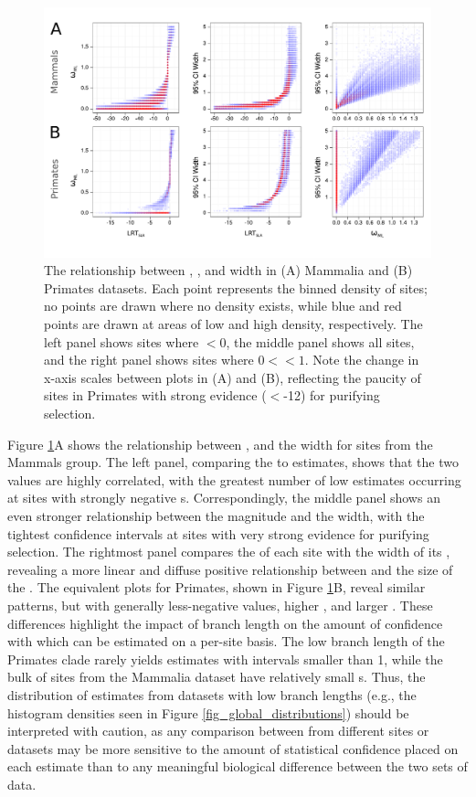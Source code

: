 \begin{figure}[b!]
\centering
\includegraphics[scale=0.5]{Figs/sites_scatters.pdf}
\caption{The relationship between \slrt, \omgml, and \ci width in (A)
  Mammalia and (B) Primates datasets. Each point represents the binned
  density of sites; no points are drawn where no density exists, while
  blue and red points are drawn at areas of low and high density,
  respectively. The left panel shows sites where \omgml$<0$, the
  middle panel shows all sites, and the right panel shows sites where
  $0<$\xspace\omgml$<1$. Note the change in x-axis scales between plots
  in (A) and (B), reflecting the paucity of sites in Primates with
  strong evidence (\slrt$<$-12) for purifying selection.}
\label{fig_sites_scatters}
\end{figure}

Figure \ref{fig_sites_scatters}A shows the relationship between \slrt,
\omgml and the \ci width for sites from the Mammals group. The left
panel, comparing the \slrt to \nz \omgml estimates, shows that the two
values are highly correlated, with the greatest number of low \omgml
estimates occurring at sites with strongly negative
\slrt{}s. Correspondingly, the middle panel shows an even stronger
relationship between the \slrt magnitude and the \ci width, with the
tightest confidence intervals at sites with very strong evidence for
purifying selection. The rightmost panel compares the \omgml of each
site with the width of its \ci, revealing a more linear and diffuse
positive relationship between \omgml and the size of the \ci. The
equivalent plots for Primates, shown in Figure
\ref{fig_sites_scatters}B, reveal similar patterns, but with generally
less-negative \slrt values, higher \omgml, and larger \ci. These
differences highlight the impact of branch length on the amount of
confidence with which \omg can be estimated on a per-site basis. The
low branch length of the Primates clade rarely yields \omgml estimates
with \ci intervals smaller than 1, while the bulk of sites from the
Mammalia dataset have relatively small \ci{}s. Thus, the distribution
of \omgml estimates from datasets with low branch lengths (e.g., the
histogram densities seen in Figure \ref{fig_global_distributions})
should be interpreted with caution, as any comparison between \omgml
from different sites or datasets may be more sensitive to the amount
of statistical confidence placed on each estimate than to any
meaningful biological difference between the two sets of data.



